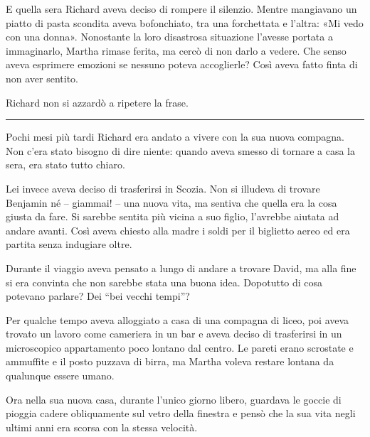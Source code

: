 E quella sera Richard aveva deciso di rompere il silenzio. Mentre mangiavano un piatto di pasta
scondita aveva bofonchiato, tra una forchettata e l'altra: «Mi vedo con una donna». Nonostante la
loro disastrosa situazione l'avesse portata a immaginarlo, Martha rimase ferita, ma cercò di non
darlo a vedere. Che senso aveva esprimere emozioni se nessuno poteva accoglierle? Così aveva fatto
finta di non aver sentito.

Richard non si azzardò a ripetere la frase.

\plainbreak{1}

Pochi mesi più tardi Richard era andato a vivere con la sua nuova compagna. Non c'era stato bisogno
di dire niente: quando aveva smesso di tornare a casa la sera, era stato tutto chiaro.

Lei invece aveva deciso di trasferirsi in Scozia. Non si illudeva di trovare Benjamin né -- giammai!
-- una nuova vita, ma sentiva che quella era la cosa giusta da fare. Si sarebbe sentita più vicina a
suo figlio, l'avrebbe aiutata ad andare avanti. Così aveva chiesto alla madre i soldi per il
biglietto aereo ed era partita senza indugiare oltre.

Durante il viaggio aveva pensato a lungo di andare a trovare David, ma alla fine si era convinta che
non sarebbe stata una buona idea. Dopotutto di cosa potevano parlare? Dei ``bei vecchi tempi''?

Per qualche tempo aveva alloggiato a casa di una compagna di liceo, poi aveva trovato un lavoro come
cameriera in un bar e aveva deciso di trasferirsi in un microscopico appartamento poco lontano dal
centro. Le pareti erano scrostate e ammuffite e il posto puzzava di birra, ma Martha voleva restare
lontana da qualunque essere umano.

Ora nella sua nuova casa, durante l'unico giorno libero, guardava le goccie di pioggia cadere
obliquamente sul vetro della finestra e pensò che la sua vita negli ultimi anni era scorsa con la
stessa velocità.
